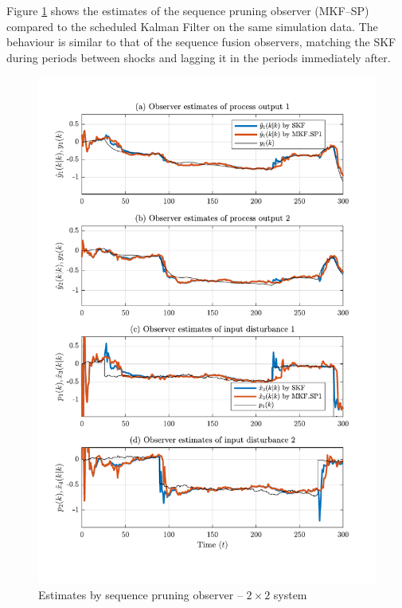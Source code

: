 Figure \ref{fig:rod-obs-sim2-yest-1-SP} shows the estimates of the sequence pruning observer (MKF--SP) compared to the scheduled Kalman Filter on the same simulation data. The behaviour is similar to that of the sequence fusion observers, matching the SKF during periods between shocks and lagging it in the periods immediately after.
\begin{figure}[htp]
	\centering
	\includegraphics[width=13cm]{images/rod_obs_sim3_all_seed_y_est1_SP1.pdf}
	\caption{Estimates by sequence pruning observer –  $2\times2$ system}
	\label{fig:rod-obs-sim2-yest-1-SP}
\end{figure}

